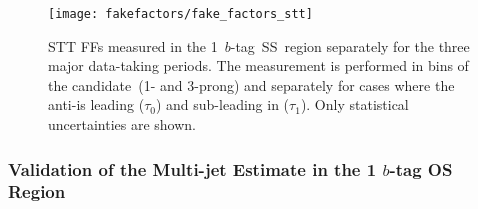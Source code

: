 

\begin{figure}[htbp]
  \centering

  \texttt{[image: fakefactors/fake\_factors\_stt]}

  \caption{STT FFs measured in the 1~$b$-tag~SS~region separately for the three
    major data-taking periods. The measurement is performed in bins of the
    \tauhadvis candidate~\Ntracks (1- and 3-prong) and separately for cases
    where the anti-\tauhadvis is leading ($\tau_0$) and sub-leading in \pT
    ($\tau_1$). Only statistical uncertainties are shown.}%
  \label{fig:mjfakes_stt_ffs}
\end{figure}

\subsubsection{Validation of the Multi-jet Estimate in the 1 $b$-tag OS Region}

